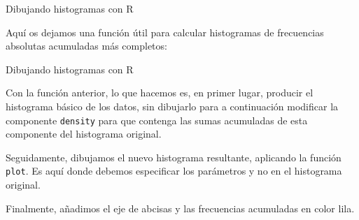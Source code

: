 \documentclass[
  ignorenonframetext,
]{beamer}
\newenvironment{Shaded}{\begin{snugshade}}{\end{snugshade}}
\newcommand{\CharTok}[1]{\textcolor[rgb]{0.31,0.60,0.02}{#1}}
\newcommand{\ControlFlowTok}[1]{\textcolor[rgb]{0.13,0.29,0.53}{\textbf{#1}}}
\newcommand{\DataTypeTok}[1]{\textcolor[rgb]{0.13,0.29,0.53}{#1}}
\newcommand{\DecValTok}[1]{\textcolor[rgb]{0.00,0.00,0.81}{#1}}
\newcommand{\KeywordTok}[1]{\textcolor[rgb]{0.13,0.29,0.53}{\textbf{#1}}}
\newcommand{\NormalTok}[1]{#1}
\newcommand{\OperatorTok}[1]{\textcolor[rgb]{0.81,0.36,0.00}{\textbf{#1}}}
\newcommand{\OtherTok}[1]{\textcolor[rgb]{0.56,0.35,0.01}{#1}}
\newcommand{\StringTok}[1]{\textcolor[rgb]{0.31,0.60,0.02}{#1}}
\begin{document}
\begin{frame}[fragile]{Dibujando histogramas con R}
\protect\hypertarget{dibujando-histogramas-con-r-7}{}

Aquí os dejamos una función útil para calcular histogramas de
frecuencias absolutas acumuladas más completos:

\begin{Shaded}
\end{Shaded}

\end{frame}

\begin{frame}[fragile]{Dibujando histogramas con R}
\protect\hypertarget{dibujando-histogramas-con-r-8}{}

Con la función anterior, lo que hacemos es, en primer lugar, producir el
histograma básico de los datos, sin dibujarlo para a continuación
modificar la componente \texttt{density} para que contenga las sumas
acumuladas de esta componente del histograma original.

Seguidamente, dibujamos el nuevo histograma resultante, aplicando la
función \texttt{plot}. Es aquí donde debemos especificar los parámetros
y no en el histograma original.

Finalmente, añadimos el eje de abcisas y las frecuencias acumuladas en
color lila.

\end{frame}
\end{document}
